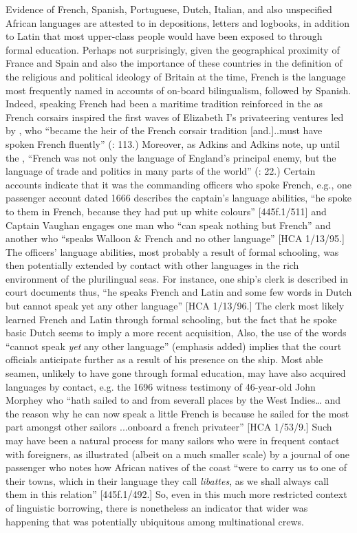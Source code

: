 Evidence of French, Spanish, Portuguese, Dutch, Italian, and also unspecified African languages are attested to in depositions, letters and logbooks, in addition to Latin that most upper-class people would have been exposed to through formal education. Perhaps not surprisingly, given the geographical proximity of France and Spain and also the importance of these countries in the definition of the religious and political ideology of Britain at the time, French is the language most frequently named in accounts of on-board bilingualism, followed by Spanish. Indeed, speaking French had been a maritime tradition reinforced in the  as French corsairs inspired the first waves of Elizabeth I’s privateering ventures led by , who “became the heir of the French corsair tradition [and.]..must have spoken French fluently” (\citealt{Bicheno2012}: 113.) Moreover, as Adkins and Adkins note, up until the , “French was not only the language of England’s principal enemy, but the language of trade and politics in many parts of the world” (\citeyear*{AdkinsAdkins2008}: 22.) Certain accounts indicate that it was the commanding officers who spoke French, e.g., one passenger account dated 1666 describes the captain’s language abilities, “he spoke to them in French, because they had put up white colours” [445f.1/511] and Captain Vaughan engages one man who “can speak nothing but French” and another who “speaks Walloon \& French and no other language” [HCA 1/13/95.] The officers’ language abilities, most probably a result of formal schooling, was then potentially extended by contact with other languages in the rich environment of the plurilingual seas. For instance, one ship’s clerk is described in court documents thus, “he speaks French and Latin and some few words in Dutch but cannot speak yet any other language” [HCA 1/13/96.] The clerk most likely learned French and Latin through formal schooling, but the fact that he spoke basic Dutch seems to imply a more recent acquisition, Also, the use of the words “cannot speak \textit{yet} any other language” (emphasis added) implies that the court officials anticipate further  as a result of his presence on the ship. Most able seamen, unlikely to have gone through formal education, may have also acquired languages by contact, e.g. the 1696 witness testimony of 46-year-old John Morphey who “hath sailed to and from severall places by the West Indies… and the reason why he can now speak a little French is because he sailed for the most part amongst other sailors ...onboard a french privateer” [HCA 1/53/9.] Such  may have been a natural process for many sailors who were in frequent contact with foreigners, as illustrated (albeit on a much smaller scale) by a journal of one passenger who notes how African natives of the coast “were to carry us to one of their towns, which in their language they call \textit{libattes}, as we shall always call them in this relation” [445f.1/492.]  So, even in this much more restricted context of linguistic borrowing, there is nonetheless an indicator that wider  was happening that was potentially ubiquitous among multinational crews. 

